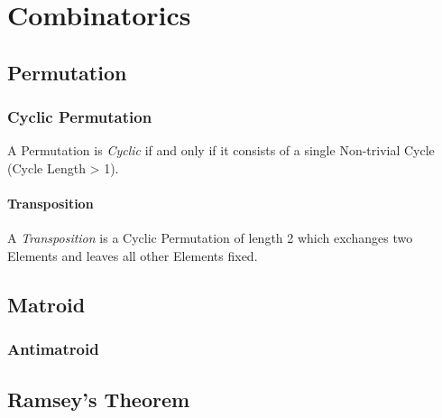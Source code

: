 \section{Combinatorics}\label{sec:combinatorics}

\subsection{Permutation}\label{sec:permutation}

\subsubsection{Cyclic Permutation}\label{sec:cyclic_permutation}

A Permutation is \emph{Cyclic} if and only if it consists of a single
Non-trivial Cycle (Cycle Length > 1).

\paragraph{Transposition}\label{sec:transposition}

A \emph{Transposition} is a Cyclic Permutation of length 2 which
exchanges two Elements and leaves all other Elements fixed.



\subsection{Matroid}\label{sec:matroid}

\subsubsection{Antimatroid}\label{sec:antimatroid}



\subsection{Ramsey's Theorem}\label{sec:ramseys_theorem}



